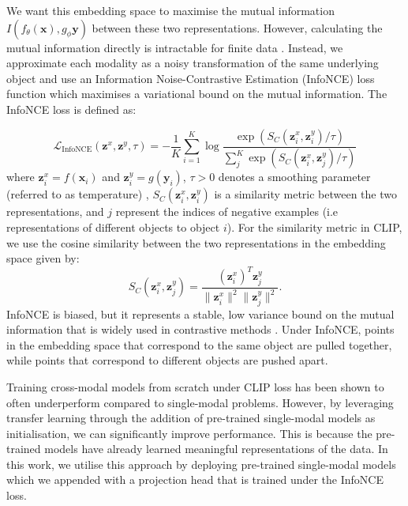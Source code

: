 \documentclass[draft, a4paper,12pt]{article}
\begin{document}
We want this embedding space to maximise the mutual information $I(f_{\theta}(\mathbf{x}),g_\phi{\mathbf{y}})$ between these two representations. However, calculating the mutual information directly is intractable for finite data \cite{mutualinfolimitation}. Instead, we approximate each modality as a noisy transformation of the same underlying object and use an Information Noise-Contrastive Estimation (InfoNCE) loss function \cite{infonce} which maximises a variational bound on the mutual information. The InfoNCE loss is defined as:

\begin{equation}
    \mathcal{L}_{\text{InfoNCE}}(\mathbf{z}^x, \mathbf{z}^y, \tau) = -\frac{1}{K} \sum_{i=1}^{K} \log \frac{\exp\left(S_C(\mathbf{z}^x_i, \mathbf{z}^y_i)/\tau\right)}{\sum_{j}^{K} \exp\left(S_C(\mathbf{z}^x_i, \mathbf{z}^y_j)/\tau\right)}
    \label{eq:infonce}
\end{equation}
where $\mathbf{z}^x_i=f(\mathbf{x}_i)$ and $\mathbf{z}^y_i=g(\mathbf{y}_i)$, $\tau > 0$ denotes a smoothing parameter (referred to as temperature) , $S_C(\mathbf{z}^x_i, \mathbf{z}^y_i)$ is a similarity metric between the two representations, and $j$ represent the indices of negative examples (i.e representations of different objects to object $i$). For the similarity metric in CLIP, we use the cosine similarity between the two representations in the embedding space given by:
\begin{equation}
    S_C(\mathbf{z}^x_i, \mathbf{z}^y_j) = \frac{(\mathbf{z}^x_i)^T \mathbf{z}^y_j}{\|\mathbf{z}^x_i\|^2 \|\mathbf{z}^y_j\|^2}.
    \label{eq:cosine}
\end{equation}
InfoNCE is biased, but it represents a stable, low variance bound on the mutual information that is widely used in contrastive methods \cite{crossCLIP}. Under InfoNCE, points in the embedding space that correspond to the same object are pulled together, while points that correspond to different objects are pushed apart.

Training cross-modal models from scratch under CLIP loss has been shown to often underperform compared to single-modal problems. However, by leveraging transfer learning through the addition of pre-trained single-modal models as initialisation, we can significantly improve performance. This is because the pre-trained models have already learned meaningful representations of the data. In this work, we utilise this approach by deploying pre-trained single-modal models which we appended with a projection head that is trained under the InfoNCE loss. 
\end{document}
